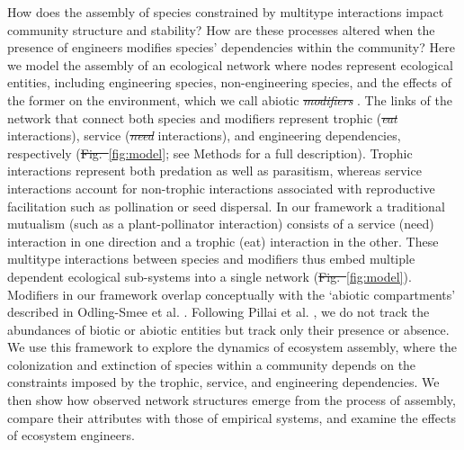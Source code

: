 \documentclass[twocolumn,preprintnumbers,amsmath,amssymb,superscriptaddress,linenumbers]{revtex4-1}
\providecommand{\DIFadd}[1]{{\protect\color{blue}\uwave{#1}}} %
\providecommand{\DIFdel}[1]{{\protect\color{red}\sout{#1}}}                      %
\providecommand{\DIFaddbegin}{} %
\providecommand{\DIFaddend}{} %
\providecommand{\DIFdelbegin}{} %
\providecommand{\DIFdelend}{} %
\newcommand{\DIFscaledelfig}{0.5}
\newlength{\DIFdelgraphicswidth} %
\newlength{\DIFdelgraphicsheight} %
\newcommand{\DIFaddincludegraphics}[2][]{{\color{blue}\fbox{\DIFOincludegraphics[#1]{#2}}}} %
\newcommand{\DIFdelincludegraphics}[2][]{%
\sbox{\DIFdelgraphicsbox}{\DIFOincludegraphics[#1]{#2}}%
\settoboxwidth{\DIFdelgraphicswidth}{\DIFdelgraphicsbox} %
\settoboxtotalheight{\DIFdelgraphicsheight}{\DIFdelgraphicsbox} %
\scalebox{\DIFscaledelfig}{%
\parbox[b]{\DIFdelgraphicswidth}{\usebox{\DIFdelgraphicsbox}\\[-\baselineskip] \rule{\DIFdelgraphicswidth}{0em}}\llap{\resizebox{\DIFdelgraphicswidth}{\DIFdelgraphicsheight}{%
\setlength{\unitlength}{\DIFdelgraphicswidth}%
\begin{picture}(1,1)%
\thicklines\linethickness{2pt} %
{\color[rgb]{1,0,0}\put(0,0){\framebox(1,1){}}}%
{\color[rgb]{1,0,0}\put(0,0){\line( 1,1){1}}}%
{\color[rgb]{1,0,0}\put(0,1){\line(1,-1){1}}}%
\end{picture}%
}\hspace*{3pt}}} %
} %
\DeclareRobustCommand{\DIFaddbegin}{\DIFOaddbegin \let\includegraphics\DIFaddincludegraphics} %
\DeclareRobustCommand{\DIFaddend}{\DIFOaddend \let\includegraphics\DIFOincludegraphics} %
\DeclareRobustCommand{\DIFdelbegin}{\DIFOdelbegin \let\includegraphics\DIFdelincludegraphics} %
\DeclareRobustCommand{\DIFdelend}{\DIFOaddend \let\includegraphics\DIFOincludegraphics} %
\begin{document}
How does the assembly of species constrained by multitype interactions impact community structure and stability?
How are these processes altered when the presence of engineers modifies species' dependencies within the community?
Here we model the assembly of an ecological network where nodes represent ecological entities, including engineering species, non-engineering species, and the effects of the former on the environment, which we call abiotic \DIFdelbegin \emph{\DIFdel{modifiers}}%
\DIFdelend \DIFaddbegin \DIFadd{`modifiers'}\DIFaddend .
The links of the network that connect both species and modifiers represent trophic (\DIFdelbegin \emph{\DIFdel{eat}} %
\DIFdelend \DIFaddbegin \DIFadd{`eat' }\DIFaddend interactions), service (\DIFdelbegin \emph{\DIFdel{need}} %
\DIFdelend \DIFaddbegin \DIFadd{`need' }\DIFaddend interactions), and engineering dependencies, respectively (\DIFdelbegin \DIFdel{Fig.\ }\DIFdelend \DIFaddbegin \DIFadd{Figure }\DIFaddend \ref{fig:model}; see Methods for a full description).
Trophic interactions represent both predation as well as parasitism, whereas service interactions account for non-trophic interactions associated with reproductive facilitation such as pollination or seed dispersal.
In our framework a traditional mutualism (such as a plant-pollinator interaction) consists of a service (need) interaction in one direction and a trophic (eat) interaction in the other.
These multitype interactions between species and modifiers thus embed multiple dependent ecological sub-systems into a single network (\DIFdelbegin \DIFdel{Fig.\ }\DIFdelend \DIFaddbegin \DIFadd{Figure }\DIFaddend \ref{fig:model}). %
Modifiers in our framework overlap conceptually with the `abiotic compartments' described in Odling-Smee et al. \cite{OdlingSmee2013}.
Following Pillai et al. \cite{Pillai2011}, we do not track the abundances of biotic or abiotic entities but track only their presence or absence.
We use this framework to explore the dynamics of ecosystem assembly, where the colonization and extinction of species within a community depends on the constraints imposed by the trophic, service, and engineering dependencies.
We then show how observed network structures emerge from the process of assembly, compare their attributes with those of empirical systems, and examine the effects of ecosystem engineers.
\end{document}
